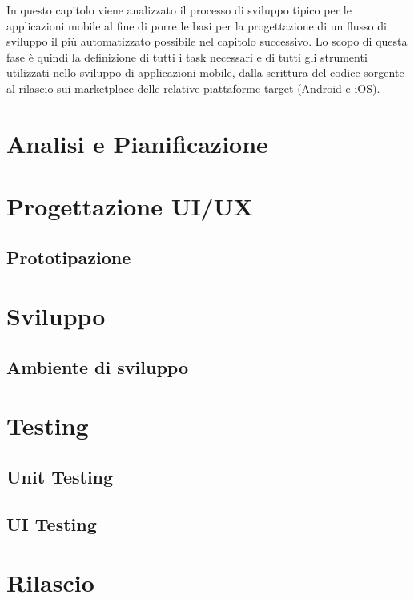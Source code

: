 
In questo capitolo viene analizzato il processo di sviluppo tipico per le applicazioni mobile al fine di porre le basi per la progettazione di un flusso di sviluppo il più automatizzato possibile nel capitolo successivo. Lo scopo di questa fase è quindi la definizione di tutti i task necessari e di tutti gli strumenti utilizzati nello sviluppo di applicazioni mobile, dalla scrittura del codice sorgente al rilascio sui marketplace delle relative piattaforme target (Android e iOS).
\section{Analisi e Pianificazione}
\section{Progettazione UI/UX}
\subsection{Prototipazione}
\section{Sviluppo}
\subsection{Ambiente di sviluppo}
\section{Testing}
\subsection{Unit Testing}
\subsection{UI Testing}
\section{Rilascio}
